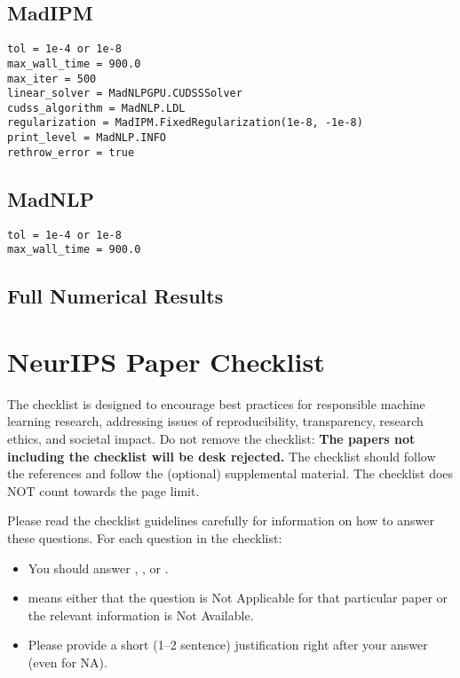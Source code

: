 \documentclass{article}
\begin{document}
\subsection{MadIPM} 
\begin{verbatim}
tol = 1e-4 or 1e-8
max_wall_time = 900.0
max_iter = 500
linear_solver = MadNLPGPU.CUDSSSolver
cudss_algorithm = MadNLP.LDL
regularization = MadIPM.FixedRegularization(1e-8, -1e-8)
print_level = MadNLP.INFO
rethrow_error = true
\end{verbatim}
\subsection{MadNLP}
\begin{verbatim}
tol = 1e-4 or 1e-8
max_wall_time = 900.0
\end{verbatim}
\subsection{Full Numerical Results}







\newpage
\section*{NeurIPS Paper Checklist}

The checklist is designed to encourage best practices for responsible machine learning research, addressing issues of reproducibility, transparency, research ethics, and societal impact. Do not remove the checklist: {\bf The papers not including the checklist will be desk rejected.} The checklist should follow the references and follow the (optional) supplemental material.  The checklist does NOT count towards the page
limit.

Please read the checklist guidelines carefully for information on how to answer these questions. For each question in the checklist:
\begin{itemize}
    \item You should answer \answerYes{}, \answerNo{}, or \answerNA{}.
    \item \answerNA{} means either that the question is Not Applicable for that particular paper or the relevant information is Not Available.
    \item Please provide a short (1–2 sentence) justification right after your answer (even for NA).
\end{itemize}
\end{document}
